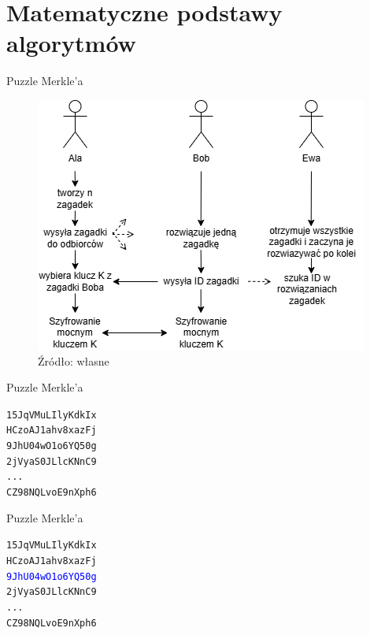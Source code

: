\section{Matematyczne podstawy algorytmów}

\begin{frame}{Puzzle Merkle'a}
    \begin{figure}
        \centering
            \includegraphics[height=0.45\textwidth]{teoria/graphics/ala_bob_ewa.png}
            \caption{Źródło: własne}
    \end{figure}
\end{frame}

\begin{frame}{Puzzle Merkle'a}
    \begin{center}
    \texttt{15JqVMuLIlyKdkIx} \\
    \texttt{HCzoAJ1ahv8xazFj} \\
    \texttt{9JhU04wO1o6YQ50g} \\
    \texttt{2jVyaS0JLlcKNnC9} \\
    \texttt{...} \\
    \texttt{CZ98NQLvoE9nXph6}
    \end{center}
\end{frame}

\begin{frame}{Puzzle Merkle'a}
    \begin{center}
    \texttt{15JqVMuLIlyKdkIx} \\
    \texttt{HCzoAJ1ahv8xazFj} \\
    \texttt{\textcolor{blue}{9JhU04wO1o6YQ50g}} \\ %
    \texttt{2jVyaS0JLlcKNnC9} \\
    \texttt{...} \\
    \texttt{CZ98NQLvoE9nXph6}
    \end{center}
\end{frame}


